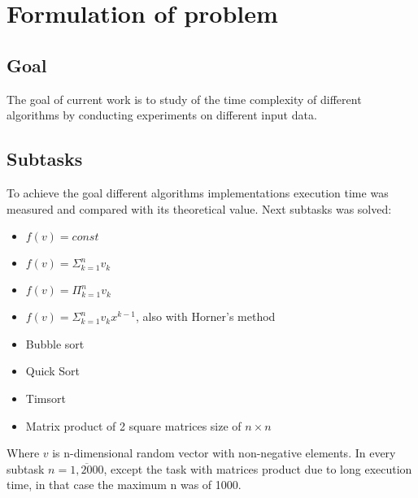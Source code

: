 \section*{Formulation of problem}

\subsection*{Goal}
The goal of current work is to study of the time complexity of different algorithms by conducting experiments on different input data.

\subsection*{Subtasks}

To achieve the goal different algorithms implementations execution time was measured and compared with its theoretical value. 
Next subtasks was solved:

\begin{itemize}
    \item $f(v) = const$
    \item $f(v) = \Sigma_{k=1}^{n} v_k$
    \item $f(v) = \Pi_{k=1}^{n} v_k $
    \item $f(v) = \Sigma_{k=1}^{n} v_kx^{k - 1}$, also with Horner's method
    \item Bubble sort
    \item Quick Sort
    \item Timsort
    \item Matrix product of 2 square matrices size of $ n\times n$ 
\end{itemize}

Where $v$ is n-dimensional random vector with non-negative elements. In every subtask $n=\overline{1,2000}$, except
the task with matrices product due to long execution time, in that case the maximum n was of 1000.
